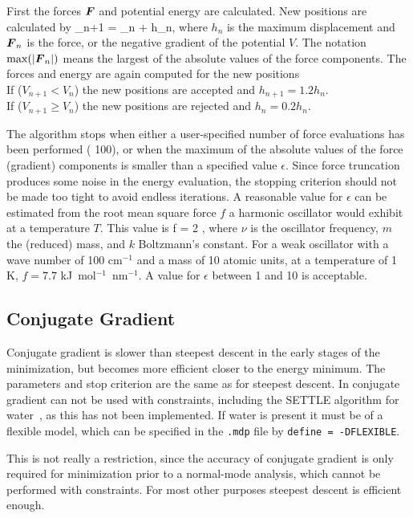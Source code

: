 First the forces $\mbox{\boldmath ${F}$}$ and potential energy are calculated.
New positions are calculated by
\beq
{}_{n+1} =  _n +  h_n,
\eeq
where $h_n$ is the maximum displacement and $\mbox{\boldmath ${F}$}_n$ is the force,
or the negative gradient of the  potential $V$. The notation $\max
(|\mbox{\boldmath ${F}$}_n|)$ means the largest of the absolute values of the force
components.  The forces and energy are again computed for the new positions \\
If ($V_{n+1} < V_n$) the new positions are accepted and $h_{n+1} = 1.2
h_n$. \\
If ($V_{n+1} \geq V_n$) the new positions are rejected and $h_n = 0.2 h_n$.

The algorithm stops when either a user-specified number of force 
evaluations has been performed ({\eg} 100), or when the maximum of the absolute
values of the force (gradient) components is smaller than a specified
value $\epsilon$.
Since force truncation produces some noise in the
energy evaluation, the stopping criterion should not be made too tight
to avoid endless iterations. A reasonable value for $\epsilon$ can be
estimated from the root mean square force $f$ a harmonic oscillator would exhibit at a
temperature $T$. This value is
\beq
  f = 2 \pi \nu {},
\eeq
where $\nu$ is the oscillator frequency, $m$ the (reduced) mass, and
$k$ Boltzmann's constant. For a weak oscillator with a wave number of
100 cm$^{-1}$ and a mass of 10 atomic units, at a temperature of 1 K,
$f=7.7$ kJ~mol$^{-1}$~nm$^{-1}$. A value for $\epsilon$ between 1 and
10 is acceptable.   

\subsection{Conjugate Gradient}
Conjugate gradient is slower than steepest descent in the early stages
of the minimization, but becomes more efficient closer to the energy
minimum.  The parameters and stop criterion are the same as for
steepest descent.  In {\gromacs} conjugate gradient can not be used
with constraints, including the SETTLE algorithm for
water~\cite{Miyamoto92}, as this has not been implemented. If water is
present it must be of a flexible model, which can be specified in the
{\tt *.mdp} file by {\tt define = -DFLEXIBLE}.

This is not really a restriction, since the accuracy of conjugate
gradient is only required for minimization prior to a normal-mode
analysis, which cannot be performed with constraints.  For most other
purposes steepest descent is efficient enough.

